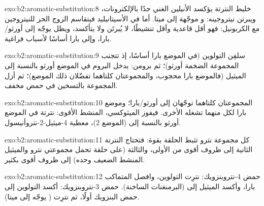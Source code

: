 \begin{solution}{exo:b2:aromatic-substitution:8}
خليط النترتة يؤكسد الأنيلين الغني جدًا بالإلكترونات، ويبرتن نيتروجينه:
و  موجّهة إلى ميتا. أما في الأسيتانيليد فيتقاسم الزوج الحر للنيتروجين
مع الكربونيل: فهو أقل قاعدية وأقل تنشيطًا، لا يُبرتَن ولا يتأكسد،
ويظل يوجّه إلى أورثو/بارا، وإلى بارا أساسًا لأسباب فراغية.
\end{solution}

\begin{solution}{exo:b2:aromatic-substitution:9}
سلفِن التولوين (في الموضع بارا أساسًا، إذ تتجنب المجموعة الضخمة أورثو)؛ ثم برومن: يدخل البروم
في الموضع أورثو بالنسبة إلى الميثيل (فالموضع بارا محجوب، والمجموعتان كلتاهما تفضّلان ذلك الموضع)؛
ثم أزل المجموعة  بالتسخين في حمض مخفف.
\end{solution}

\begin{solution}{exo:b2:aromatic-substitution:10}
المجموعتان كلتاهما توجّهان إلى أورثو/بارا؛ وموضع بارا لكل منهما تشغله الأخرى. فيفوز الميثوكسي،
المنشط الأقوى: نترتة في الموضع أورثو بالنسبة إلى  (الموضع 2)، معطية
4-ميثيل-2-نتروأنيسول.
\end{solution}

\begin{solution}{exo:b2:aromatic-substitution:11}
كل مجموعة نترو تثبط الحلقة بقوة: فتحتاج النترتة الثانية إلى ظروف أقوى
من الأولى، والثالثة (على حلقة تحمل مجموعتي نترو والميثيل المنشط الضعيف
وحده) إلى ظروف أقوى بكثير.
\end{solution}

\begin{solution}{exo:b2:aromatic-substitution:12}
حمض 4-نتروبنزويك: نترِت التولوين، وافصل المتماكب بارا، وأكسد الميثيل إلى
 (البرمنغنات الساخنة). حمض 3-نتروبنزويك: أكسد التولوين إلى حمض البنزويك أولًا، ثم
نترِت ( يوجّه إلى ميتا).
\end{solution}

